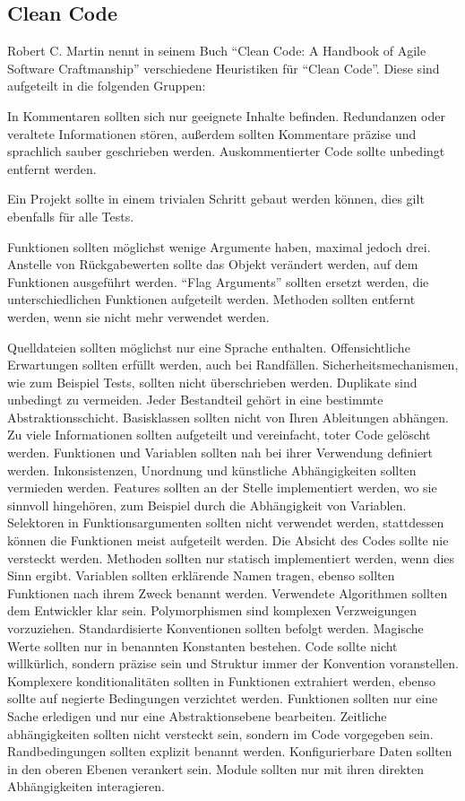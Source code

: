\newpage

\subsection{Clean Code}
Robert C. Martin nennt in seinem Buch \enquote{Clean Code: A Handbook of Agile Software Craftmanship}\cite{clean-code} verschiedene Heuristiken für \enquote{Clean Code}.
Diese sind aufgeteilt in die folgenden Gruppen:

In Kommentaren sollten sich nur geeignete Inhalte befinden.
Redundanzen oder veraltete Informationen stören, außerdem sollten Kommentare präzise und sprachlich sauber geschrieben werden.
Auskommentierter Code sollte unbedingt entfernt werden.

Ein Projekt sollte in einem trivialen Schritt gebaut werden können, dies gilt ebenfalls für alle Tests.

Funktionen sollten möglichst wenige Argumente haben, maximal jedoch drei.
Anstelle von Rückgabewerten sollte das Objekt verändert werden, auf dem Funktionen ausgeführt werden.
\enquote{Flag Arguments} sollten ersetzt werden, die unterschiedlichen Funktionen aufgeteilt werden.
Methoden sollten entfernt werden, wenn sie nicht mehr verwendet werden.

Quelldateien sollten möglichst nur eine Sprache enthalten.
Offensichtliche Erwartungen sollten erfüllt werden, auch bei Randfällen.
Sicherheitsmechanismen, wie zum Beispiel Tests, sollten nicht überschrieben werden.
Duplikate sind unbedingt zu vermeiden.
Jeder Bestandteil gehört in eine bestimmte Abstraktionsschicht.
Basisklassen sollten nicht von Ihren Ableitungen abhängen.
Zu viele Informationen sollten aufgeteilt und vereinfacht, toter Code gelöscht werden.
Funktionen und Variablen sollten nah bei ihrer Verwendung definiert werden.
Inkonsistenzen, Unordnung und künstliche Abhängigkeiten sollten vermieden werden.
Features sollten an der Stelle implementiert werden, wo sie sinnvoll hingehören, zum Beispiel durch die Abhängigkeit von Variablen.
Selektoren in Funktionsargumenten sollten nicht verwendet werden, stattdessen können die Funktionen meist aufgeteilt werden.
Die Absicht des Codes sollte nie versteckt werden.
Methoden sollten nur statisch implementiert werden, wenn dies Sinn ergibt.
Variablen sollten erklärende Namen tragen, ebenso sollten Funktionen nach ihrem Zweck benannt werden.
Verwendete Algorithmen sollten dem Entwickler klar sein.
Polymorphismen sind komplexen Verzweigungen vorzuziehen.
Standardisierte Konventionen sollten befolgt werden.
Magische Werte sollten nur in benannten Konstanten bestehen.
Code sollte nicht willkürlich, sondern präzise sein und Struktur immer der Konvention voranstellen.
Komplexere konditionalitäten sollten in Funktionen extrahiert werden, ebenso sollte auf negierte Bedingungen verzichtet werden.
Funktionen sollten nur eine Sache erledigen und nur eine Abstraktionsebene bearbeiten.
Zeitliche abhängigkeiten sollten nicht versteckt sein, sondern im Code vorgegeben sein.
Randbedingungen sollten explizit benannt werden.
Konfigurierbare Daten sollten in den oberen Ebenen verankert sein.
Module sollten nur mit ihren direkten Abhängigkeiten interagieren.

